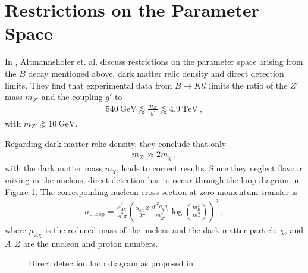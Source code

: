 
\section{Restrictions on the Parameter Space\label{sec:ParamSpace}}
In \cite{Z}, Altmannshofer et. al. discuss restrictions on the parameter space arising from the $B$ decay mentioned above, dark matter relic density and direct detection limits. They find that experimental data from $B\rightarrow Kl\bar{l}$ limits the ratio of the $Z'$ mass $m_{Z'}$ and the coupling $g'$ to
\begin{align}\label{eq:BoundBS}
	\SI{540}{\giga\electronvolt}\lessapprox\frac{m_{Z'}}{g'}\lessapprox\SI{4.9}{\tera\electronvolt} \ ,
\end{align}
with $m_{Z'}\gtrapprox\SI{10}{\giga\electronvolt}$.



\begin{minipage}{0.67\textwidth}
	Regarding dark matter relic density, they conclude that only
	\begin{align}\label{eq:Relic}
		m_{Z'}\approx 2m_\chi \ ,
	\end{align}
	with the dark matter mass $m_\chi$, leads to correct results. Since they neglect flavour mixing in the nucleus, direct detection has to occur through the loop diagram in Figure \ref{fig:Loop}. The corresponding nucleon cross section at zero momentum transfer is
	\begin{align}\label{eq:Loop}
		\sigma_\text{0,loop} = \frac{\mu_{A\chi}^2}{A^2\pi}\left(\frac{\alpha_{em}Z}{3\pi}\ \frac{g'^2q_\chi q_l}{m_{Z'}^2}\log\left(\frac{m_\mu^2}{m_\tau^2}\right)\right)^2 \ ,
	\end{align}
	where $\mu_{A\chi}$ is the reduced mass of the nucleus and the dark matter particle $\chi$, and $A,Z$ are the nucleon and proton numbers.
\end{minipage} \hfill
\begin{minipage}{0.28\textwidth}
	\begin{figure}[H]
		\centering
		\resizebox{\textwidth}{!}{
				
		}
		\captionsetup{width=\textwidth}
		\caption{Direct detection loop diagram as proposed in \cite{Z}.}
		\label{fig:Loop}
	\end{figure}
\end{minipage}



